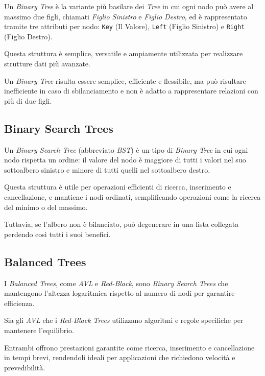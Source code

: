 \documentclass[12pt,a4paper,openright,twoside]{book}
\begin{document}
            Un \textit{Binary Tree} è la variante più basilare dei \textit{Tree} in cui ogni nodo può avere al massimo due figli, chiamati \textit{Figlio Sinistro} e \textit{Figlio Destro}, ed è rappresentato tramite tre attributi per nodo: \texttt{Key} (Il Valore), \texttt{Left} (Figlio Sinistro) e \texttt{Right} (Figlio Destro).

            Questa struttura è semplice, versatile e ampiamente utilizzata per realizzare strutture dati più avanzate.

            Un \textit{Binary Tree} risulta essere semplice, efficiente e flessibile, ma può risultare inefficiente in caso di sbilanciamento e non è adatto a rappresentare relazioni con più di due figli.

        \subsection{Binary Search Trees}

            Un \textit{Binary Search Tree} (abbreviato \textit{BST}) è un tipo di \textit{Binary Tree} in cui ogni nodo rispetta un ordine: il valore del nodo è maggiore di tutti i valori nel suo sottoalbero sinistro e minore di tutti quelli nel sottoalbero destro.

            \pagebreak

            Questa struttura è utile per operazioni efficienti di ricerca, inserimento e cancellazione, e mantiene i nodi ordinati, semplificando operazioni come la ricerca del minimo o del massimo.

            Tuttavia, se l'albero non è bilanciato, può degenerare in una lista collegata perdendo così tutti i suoi benefici.

        \subsection{Balanced Trees}
            I \textit{Balanced Trees}, come \textit{AVL} e \textit{Red-Black}, sono \textit{Binary Search Trees} che mantengono l'altezza logaritmica rispetto al numero di nodi per garantire efficienza.

            Sia gli \textit{AVL} che i \textit{Red-Black Trees} utilizzano algoritmi e regole specifiche per mantenere l'equilibrio.

            Entrambi offrono prestazioni garantite come ricerca, inserimento e cancellazione in tempi brevi, rendendoli ideali per applicazioni che richiedono velocità e prevedibilità.
\end{document}
